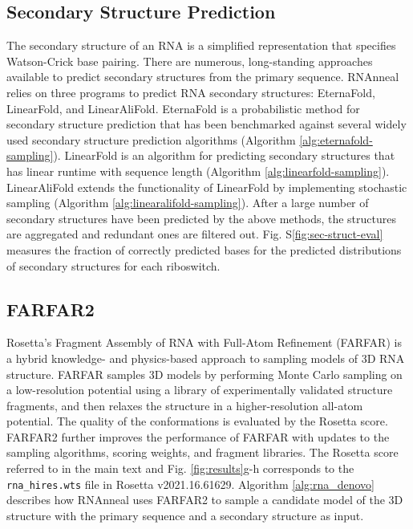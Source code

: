 \documentclass[%
aip,
 amsmath,amssymb,
reprint,%
twocolumn,
]{revtex4-1}
\makeatletter
\newcommand\setcurrentname[1]{\def\@currentlabelname{#1}}
\makeatother
\begin{document}
{\subsection*{Secondary Structure Prediction}
\setcurrentname{Secondary Structure Prediction}
\label{methods:sec-struct}
The secondary structure of an RNA is a simplified representation that specifies Watson-Crick base pairing. There are numerous, long-standing approaches available to predict secondary structures from the primary sequence.\cite{sato2023recent} RNAnneal relies on three programs to predict RNA secondary structures: EternaFold\cite{wayment2022rna}, LinearFold\cite{huang2019linearfold}, and LinearAliFold\cite{huang2019linearfold}. EternaFold is a probabilistic method for secondary structure prediction that
has been benchmarked against several widely used secondary structure prediction algorithms (Algorithm \ref{alg:eternafold-sampling}). LinearFold is an algorithm for predicting secondary structures that has linear runtime with sequence length (Algorithm \ref{alg:linearfold-sampling}). LinearAliFold extends the functionality of LinearFold by implementing stochastic sampling (Algorithm \ref{alg:linearalifold-sampling}). After a large number of secondary structures have been predicted by the above methods, the structures are aggregated and redundant ones are filtered out.  Fig. S\ref{fig:sec-struct-eval} measures the fraction of correctly predicted bases for the predicted distributions of secondary structures for each riboswitch. 

\subsection*{FARFAR2}
\setcurrentname{FARFAR2}
\label{methods:tertiary-struct}

Rosetta's Fragment Assembly of RNA with Full-Atom Refinement (FARFAR) is a hybrid knowledge- and physics-based approach to sampling models of 3D RNA structure.\cite{das2010atomic} FARFAR samples 3D models by performing Monte Carlo sampling on a low-resolution potential using a library of experimentally validated structure fragments, and then relaxes the structure in a higher-resolution all-atom potential. The quality of the conformations is evaluated by the Rosetta score. FARFAR2 further improves the performance of FARFAR with updates to the sampling algorithms, scoring weights, and fragment libraries.\cite{watkins2020farfar2} The Rosetta score referred to in the main text and Fig. \ref{fig:results}g-h corresponds to the \texttt{rna\_hires.wts} file in Rosetta v2021.16.61629. Algorithm \ref{alg:rna_denovo} describes how RNAnneal uses FARFAR2 to sample a candidate model of the 3D structure with the primary sequence and a secondary structure as input.

}
\end{document}
